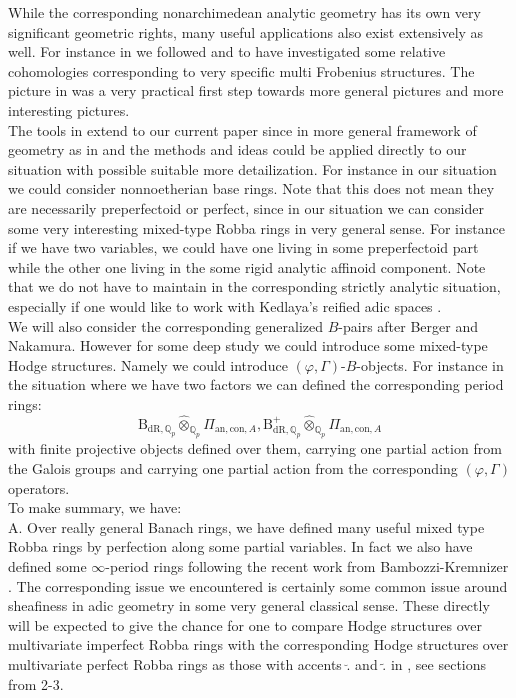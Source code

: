 \documentclass[12pt]{amsart}
\theoremstyle{definition}
\numberwithin{equation}{section}
\begin{document}
\indent While the corresponding nonarchimedean analytic geometry has its own very significant geometric rights, many useful applications also exist extensively as well. For instance in \cite{T1} we followed \cite{CKZ} and \cite{PZ} to have investigated some relative cohomologies corresponding to very specific multi Frobenius structures. The picture in \cite{T1} was a very practical first step towards more general pictures and more interesting pictures.\\

\indent The tools in \cite{T1} extend to our current paper since in more general framework of geometry as in \cite{KL1} and \cite{KL2} the methods and ideas could be applied directly to our situation with possible suitable more detailization. For instance in our situation we could consider nonnoetherian base rings. Note that this does not mean they are necessarily preperfectoid or perfect, since in our situation we can consider some very interesting mixed-type Robba rings in very general sense. For instance if we have two variables, we could have one living in some preperfectoid part while the other one living in the some rigid analytic affinoid component. Note that we do not have to maintain in the corresponding strictly analytic situation, especially if one would like to work with Kedlaya's reified adic spaces \cite{Ked1}.\\


\indent We will also consider the corresponding generalized $B$-pairs after Berger and Nakamura. However for some deep study we could introduce some mixed-type Hodge structures. Namely we could introduce $(\varphi,\Gamma)$-$B$-objects. For instance in the situation where we have two factors we can defined the corresponding period rings:
\begin{displaymath}
\mathrm{B}_{\mathrm{dR},\mathbb{Q}_p}\widehat{\otimes}_{\mathbb{Q}_p}\Pi_{\mathrm{an},\mathrm{con},A},\mathrm{B}^+_{\mathrm{dR},\mathbb{Q}_p}\widehat{\otimes}_{\mathbb{Q}_p}\Pi_{\mathrm{an},\mathrm{con},A}	
\end{displaymath}
with finite projective objects defined over them, carrying one partial action from the Galois groups and carrying one partial action from the corresponding $(\varphi,\Gamma)$ operators.\\



\indent To make summary, we have:\\


\noindent A. Over really general Banach rings, we have defined many useful mixed type Robba rings by perfection along some partial variables. In fact we also have defined some $\infty$-period rings following the recent work from Bambozzi-Kremnizer \cite{BK}. The corresponding issue we encountered is certainly some common issue around sheafiness in adic geometry in some very general classical sense. These directly will be expected to give the chance for one to compare Hodge structures over multivariate imperfect Robba rings with the corresponding Hodge structures over multivariate perfect Robba rings as those with accents $\breve{.}$ and $\widetilde{.}$ in \cite{KL2}, see sections from 2-3. \\
\end{document}
